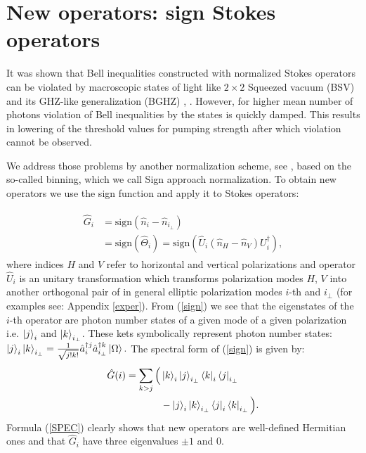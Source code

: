 \documentclass[aps,pra, twocolumn, showpacs]{revtex4-2}
\begin{document}
\section{New operators: sign Stokes operators}
It was shown that Bell inequalities constructed with normalized Stokes operators can be violated by macroscopic states of light like $2 \times 2$ Squeezed vacuum (BSV) and its  GHZ-like generalization (BGHZ) \cite{ZUKUBELL}, \cite{BGHZ}. However, for higher mean number of photons violation of Bell inequalities by the states is quickly damped. This results in lowering of the threshold values for pumping strength after which violation cannot be observed. 

We  address those problems by another normalization scheme, see \cite{PhysRevA.104.043323}, based on the so-called binning, which we call Sign approach normalization. To obtain new operators we use the  sign function and apply it to Stokes operators:  

\begin{align}
\begin{split}
\hat G_i&=\mathrm{sign}(\hat n_i-\hat n_{i_\bot})\\
&= \mathrm{sign}(\hat \Theta_i)=\mathrm{sign}(\hat U_i(\hat n_H-\hat n_{V})U_i^{\dagger}),
\label{sign}
\end{split}
\end{align}
where indices $H$ and $V$ refer to horizontal and vertical polarizations and operator $\hat U_i$ is an unitary transformation which transforms polarization modes $H$, $V$ into another orthogonal pair of in general elliptic polarization modes $i$-th and $i_\perp$ (for examples see: Appendix \ref{exper}). 
From (\ref{sign}) we see that the eigenstates of the $i$-th operator are photon number states of a given mode of a given polarization i.e. $\ket{j}_i$ and
$\ket{k}_{i_{\perp}}$. 
These kets symbolically represent photon number states: $\ket{j}_i
\ket{k}_{i_{\perp}}=\frac{1}{\sqrt{j!k!}}\hat{a}_i^{\dagger j}\hat{a}_{i_\perp}^{\dagger k}\ket{\Omega}.$
The  spectral form  of (\ref{sign}) is given by:
\begin{align}
\begin{split}
\hat G(i)=\sum_{k>j}\Big(&\ket{k}_i\ket{j}_{i_\bot}\bra{k}_i\bra{j}_{i_\bot}\\
&-\ket{j}_i\ket{k}_{i_\bot}\bra{j}_i\bra{k}_{i_\bot}\Big).
\label{SPEC}
\end{split}
\end{align}
Formula (\ref{SPEC})  clearly shows that new  operators are well-defined Hermitian ones and that $ \hat G_i $ have three eigenvalues $\pm1$ and $0$. 
\end{document}
